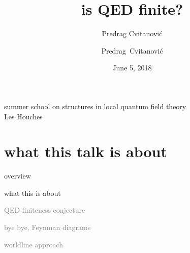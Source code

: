 



\usepackage[font=scriptsize, labelfont=bf]{caption}
\usepackage[
    backend=biber,  %
    sorting=nyt,
    style=numeric, %
    natbib=true,
    style=phys, %
    biblabel= brackets, %
    articletitle=false, %
    pageranges = true , %
    sortlocale=en_US,
    firstinits=true,
    url=false, %
    doi=false, %
    eprint=false
]{biblatex}


\renewcommand{\Ssym}[1]{{\ensuremath{m_{#1}}}}    %




\title{
{\huge is QED finite?}
}
\author{Predrag Cvitanovi\'c}
\author[Cvitanovi\'c]
{
  \textcolor{green!50!black}{
  {Predrag~Cvitanovi\'c
  }	%
  }
}
\institute
{
summer school on structures in local quantum field theory
\\
Les Houches
 }
\date{June 5, 2018}

\begin{frame}
  \titlepage
\end{frame}

\section[what this talk is about]
 {what this talk is about}

\begin{frame}{overview}
\begin{enumerate}
              \item {\Large
what this is about
                  }\textcolor{gray}{\small
              \item
QED finiteness conjecture
              \item
bye bye, Feynman diagrams
              \item
worldline approach
                    }
\end{enumerate}
\end{frame}

